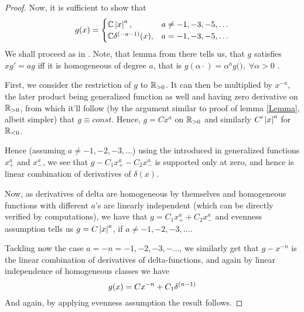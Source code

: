 \documentclass[10pt]{article} %
\begin{document}
\begin{proof}
		Now, it is sufficient to show that
		\[g(x)=\begin{cases}
		\mathbb{C}\left|x\right|^a,&a\neq-1,-3,-5,\hdots\\
		\mathbb{C}\delta^{\left(-a-1\right)}(x),&a=-1,-3,-5,\hdots
		\end{cases}\]
		We shall proceed as in \cite[Sec 3.11]{gelfand}. Note, that lemma from there tells us, that
		$g$ satisfies $xg'=ag$ iff it is homogeneous of degree $a$, that is $g(\alpha\cdot)=\alpha^ag(\dot),\;\forall\alpha>0$
		.

		First, we consider the restriction of $g$ to $\mathbb{R}_{>0}$. It can then be multiplied by $x^{-a}$, the later
		product being generalized function as well and having zero derivative on $\mathbb{R}_{>0}$, from which it'll follow
		(by the argument similar to proof of lemma \ref{Lemma}, albeit simpler)
		that $g\equiv const$. Hence, $g=Cx^a$ on $\mathbb{R}_{>0}$ and similarly $C'\left|x\right|^a$ for $\mathbb{R}_{<0}$.
		
		Hence (assuming $a\neq-1,-2,-3,\hdots$)
		using the introduced in \cite{gelfand} generalized functions $x^a_+$ and $x_-^a$, we
		see that $g-C_1x_+^a-C_2x_-^a$ is supported only at zero, and hence is linear combination of derivatives
		of $\delta(x)$.

		Now, as derivatives of delta are homogeneous by themselves and homogeneous functions with different $a$'s
		 are linearly independent
		(which can be directly verified by computations), we have that $g=C_1x_+^a+C_2x^a_-$ and evenness assumption
		tells us $g=C\left|x\right|^a$, if $a\neq-1,-2,-3,\hdots$.

		Tackling now the case $a=-n=-1,-2,-3,-\hdots$, we similarly get that $g-x^{-n}$ is the linear combination of
		derivatives of delta-functions, and again by linear independence of homogeneous classes we have
		\[g(x)=Cx^{-n}+C_1\delta^{\left(n-1\right)}\]
		And again, by applying evenness assumption the result follows.
	\end{proof}
\end{document}
